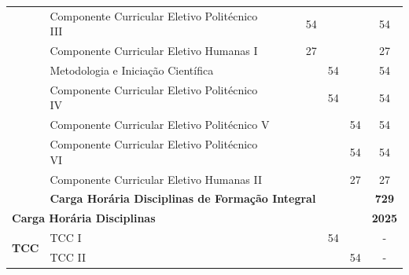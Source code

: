\documentclass[11pt,fleqn]{book} %
\begin{document}
\begin{table}[]
{\begin{tabular}{|l|l|c|c|c|c|c|c|}
				& Componente Curricular Eletivo Politécnico III &                      &                      & 54                   &                      &                      & 54            \\ \cline{2-8} 
				& Componente Curricular Eletivo Humanas I       &                      &                      & 27                   &                      &                      & 27            \\ \cline{2-8} 
				& Metodologia e Iniciação Científica            &                      &                      &                      & 54                   &                      & 54            \\ \cline{2-8} 
				& Componente Curricular Eletivo Politécnico IV  &                      &                      &                      & 54                   &                      & 54            \\ \cline{2-8} 
				& Componente Curricular Eletivo Politécnico V   &                      &                      &                      &                      & 54                   & 54            \\ \cline{2-8} 
				& Componente Curricular Eletivo Politécnico VI  &                      &                      &                      &                      & 54                   & 54            \\ \cline{2-8} 
				& Componente Curricular Eletivo Humanas II      &                      &                      &                      &                      & 27                   & 27            \\ \cline{2-8} 
				& \multicolumn{6}{l|}{\textbf{Carga Horária Disciplinas de Formação Integral}}                                                                                              & \textbf{729}  \\ \hline
				\multicolumn{7}{|l|}{\textbf{Carga Horária Disciplinas}}                                                                                                                                                         & \textbf{2025} \\ \hline
				\multirow{2}{*}{\textbf{TCC}}                 & TCC I                                         &                      &                      &                      & 54                   &                      & -             \\ \cline{2-8} 
				& TCC II                                        &                      &                      &                      &                      & 54                   & -             \\ \hline

\end{tabular}}
\end{table}
\end{document}
